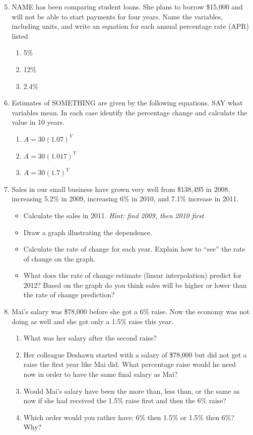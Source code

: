 \begin{enumerate} 
\setcounter{enumi}{4}

\item NAME has been comparing student loans.  She plans to borrow \$15,000 and will not be able to start payments for four years.  Name the variables, including units, and write an equation for each annual percentage rate (APR) listed
\begin{enumerate}
\item 5\%
\item 12\%
\item 2.4\%
\end{enumerate}

\item Estimates of SOMETHING are given by the following equations.  SAY what variables mean.  In each case identify the percentage change and calculate the value in 10 years. 

\begin{enumerate}
\item $A=30(1.07)^Y$
\item $A=30(1.017)^Y$
\item $A=30(1.7)^Y$
\end{enumerate}

\item Sales in our small business have grown very well from \$138,495 in 2008, increasing 5.2\% in 2009, increasing 6\% in 2010, and 7.1\% increase in 2011.  
\begin{itemize}
\item Calculate the sales in 2011. \emph{Hint:  find 2009, then 2010 first} 
\item Draw a graph illustrating the dependence.
\item Calculate the rate of change for each year.  Explain how to ``see'' the rate of change on the graph.
\item What does the rate of change estimate (linear interpolation) predict for 2012?  Based on the graph do you think sales will be higher or lower than the rate of change prediction?
\end{itemize}

\item Mai's salary was \$78,000 before she got a 6\% raise.  Now the economy was not doing as well and she got only a 1.5\% raise this year.
\begin{enumerate}
\item What was her salary after the second raise?
\item Her colleague Deshawn started with a salary of \$78,000 but did not get a raise the first year like Mai did.  What percentage raise would he need now in order to have the same final salary as Mai?
\item Would Mai's salary have been the more than, less than, or the same as now if she had received the 1.5\% raise first and then the 6\% raise?
\item Which order would you rather have:  6\% then 1.5\% or 1.5\% then 6\%?  Why?
\end{enumerate}


\end{enumerate}
